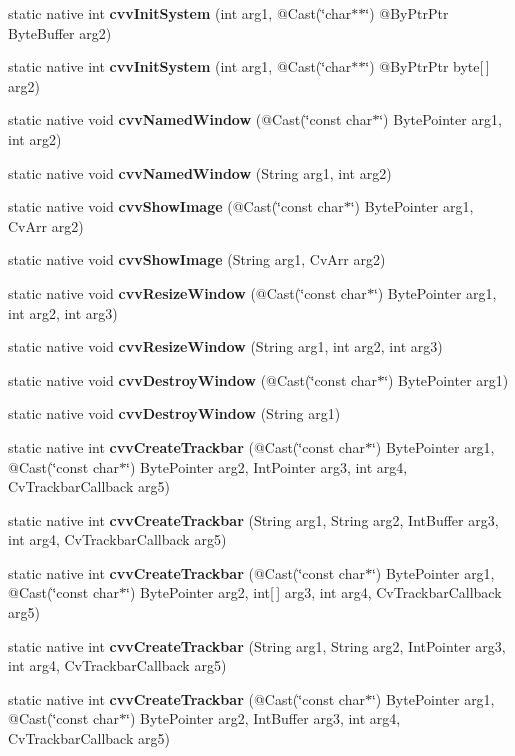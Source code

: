 \begin{DoxyCompactItemize}
static native int {\bfseries cvv\+Init\+System} (int arg1, @Cast(\char`\"{}char$\ast$$\ast$\char`\"{}) @By\+Ptr\+Ptr Byte\+Buffer arg2)
\item 
static native int {\bfseries cvv\+Init\+System} (int arg1, @Cast(\char`\"{}char$\ast$$\ast$\char`\"{}) @By\+Ptr\+Ptr byte\mbox{[}$\,$\mbox{]} arg2)
\item 
static native void {\bfseries cvv\+Named\+Window} (@Cast(\char`\"{}const char$\ast$\char`\"{}) Byte\+Pointer arg1, int arg2)
\item 
static native void {\bfseries cvv\+Named\+Window} (String arg1, int arg2)
\item 
static native void {\bfseries cvv\+Show\+Image} (@Cast(\char`\"{}const char$\ast$\char`\"{}) Byte\+Pointer arg1, Cv\+Arr arg2)
\item 
static native void {\bfseries cvv\+Show\+Image} (String arg1, Cv\+Arr arg2)
\item 
static native void {\bfseries cvv\+Resize\+Window} (@Cast(\char`\"{}const char$\ast$\char`\"{}) Byte\+Pointer arg1, int arg2, int arg3)
\item 
static native void {\bfseries cvv\+Resize\+Window} (String arg1, int arg2, int arg3)
\item 
static native void {\bfseries cvv\+Destroy\+Window} (@Cast(\char`\"{}const char$\ast$\char`\"{}) Byte\+Pointer arg1)
\item 
static native void {\bfseries cvv\+Destroy\+Window} (String arg1)
\item 
static native int {\bfseries cvv\+Create\+Trackbar} (@Cast(\char`\"{}const char$\ast$\char`\"{}) Byte\+Pointer arg1, @Cast(\char`\"{}const char$\ast$\char`\"{}) Byte\+Pointer arg2, Int\+Pointer arg3, int arg4, Cv\+Trackbar\+Callback arg5)
\item 
static native int {\bfseries cvv\+Create\+Trackbar} (String arg1, String arg2, Int\+Buffer arg3, int arg4, Cv\+Trackbar\+Callback arg5)
\item 
static native int {\bfseries cvv\+Create\+Trackbar} (@Cast(\char`\"{}const char$\ast$\char`\"{}) Byte\+Pointer arg1, @Cast(\char`\"{}const char$\ast$\char`\"{}) Byte\+Pointer arg2, int\mbox{[}$\,$\mbox{]} arg3, int arg4, Cv\+Trackbar\+Callback arg5)
\item 
static native int {\bfseries cvv\+Create\+Trackbar} (String arg1, String arg2, Int\+Pointer arg3, int arg4, Cv\+Trackbar\+Callback arg5)
\item 
static native int {\bfseries cvv\+Create\+Trackbar} (@Cast(\char`\"{}const char$\ast$\char`\"{}) Byte\+Pointer arg1, @Cast(\char`\"{}const char$\ast$\char`\"{}) Byte\+Pointer arg2, Int\+Buffer arg3, int arg4, Cv\+Trackbar\+Callback arg5)

\end{DoxyCompactItemize}
